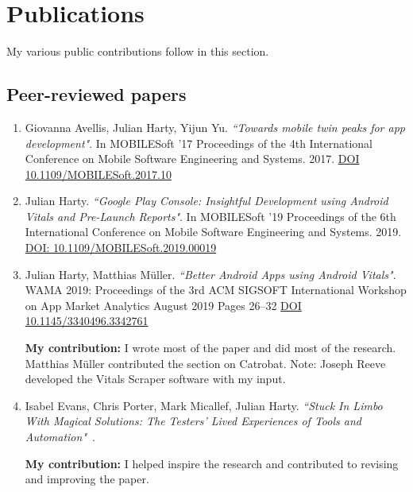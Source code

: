 \section{Publications}
My various public contributions follow in this section.

\subsection{Peer-reviewed papers}
\begin{enumerate}
    \item 	Giovanna Avellis, Julian Harty, Yijun Yu. \emph{``Towards mobile twin peaks for app development"}. In MOBILESoft '17 Proceedings of the 4th International Conference on Mobile Software Engineering and Systems. 2017. \href{https://doi.org/10.1109/MOBILESoft.2017.10}{DOI 10.1109/MOBILESoft.2017.10}~\citep{avellis_harty_yu_towards_mobile_twin_peaks}
    

    \item Julian Harty. \emph{``Google Play Console: Insightful Development using Android Vitals and Pre-Launch Reports"}. In MOBILESoft '19 Proceedings of the 6th International Conference on Mobile Software Engineering and Systems. 2019. \href{https://doi.org/10.1109/MOBILESoft.2019.00019}{DOI: 10.1109/MOBILESoft.2019.00019} ~\citep{harty_google_play_console_insightful_development_using_android_vitals_and_pre_launch_reports}
    
    \item Julian Harty, Matthias Müller. \emph{``Better Android Apps using Android Vitals"}.  WAMA 2019: Proceedings of the 3rd ACM SIGSOFT International Workshop on App Market Analytics August 2019 Pages 26–32 \href{https://doi.org/10.1145/3340496.3342761}{DOI 10.1145/3340496.3342761}~\citep{harty_better_android_apps_using_android_vitals}
    
    \textbf{My contribution:} I wrote most of the paper and did most of the research. Matthias Müller contributed the section on Catrobat. Note: Joseph Reeve developed the Vitals Scraper software with my input.
    
    \item Isabel Evans, Chris Porter, Mark Micallef, Julian Harty. \emph{``Stuck In Limbo With Magical Solutions: The Testers’ Lived Experiences of Tools and Automation"}~\citep{evans2020stuck}. 
    
    \textbf{My contribution:} I helped inspire the research and contributed to revising and improving the paper.
    

\end{enumerate}
